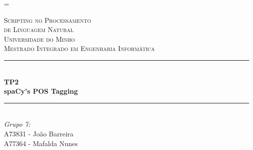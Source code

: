 \documentclass[12pt]{article}
\begin{document}
\sloppy
\LTcapwidth=\textwidth

\begin{titlepage}

\newcommand{\HRule}{\rule{\linewidth}{0.5mm}} %

\center %

\vspace{0.5cm}
 

\textsc{\LARGE Scripting no Processamento}\\[0.3cm]
\textsc{\LARGE de Linguagem Natural}\\[1.1cm] %
\textsc{\Large Universidade do Minho}\\[0.5cm] %
\textsc{\large Mestrado Integrado em Engenharia Informática}\\[0.5cm] %

\vspace{0.8cm}
\HRule \\[0.6cm]
{ \huge \bfseries TP2}\\[0.4cm] %
{ \Large \bfseries spaCy's POS Tagging}\\[0.4cm] %
\HRule \\[1.0cm]
 

\Large \emph{Grupo 7:}\\
A73831 - João Barreira\\
A77364 - Mafalda Nunes\\[1.3cm]



\end{titlepage}
\end{document}
